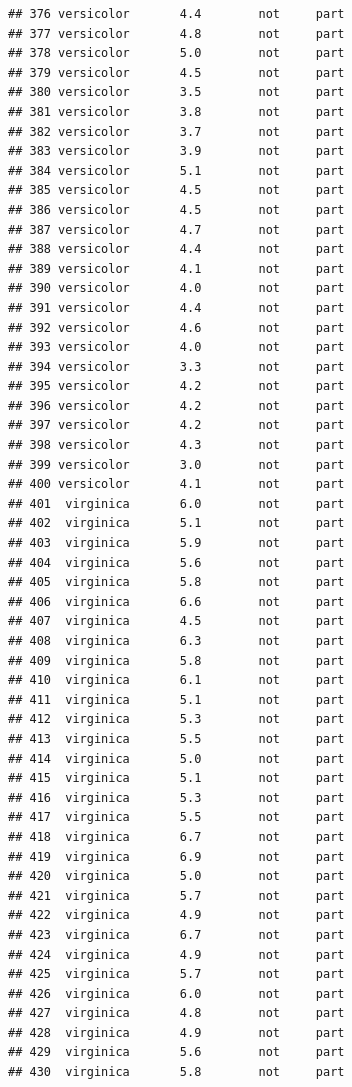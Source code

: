 \documentclass[krantz2]{krantz}\usepackage{knitr}%
\begin{document}
\begin{knitrout}
\begin{kframe}
\begin{verbatim}
## 376 versicolor       4.4        not     part
## 377 versicolor       4.8        not     part
## 378 versicolor       5.0        not     part
## 379 versicolor       4.5        not     part
## 380 versicolor       3.5        not     part
## 381 versicolor       3.8        not     part
## 382 versicolor       3.7        not     part
## 383 versicolor       3.9        not     part
## 384 versicolor       5.1        not     part
## 385 versicolor       4.5        not     part
## 386 versicolor       4.5        not     part
## 387 versicolor       4.7        not     part
## 388 versicolor       4.4        not     part
## 389 versicolor       4.1        not     part
## 390 versicolor       4.0        not     part
## 391 versicolor       4.4        not     part
## 392 versicolor       4.6        not     part
## 393 versicolor       4.0        not     part
## 394 versicolor       3.3        not     part
## 395 versicolor       4.2        not     part
## 396 versicolor       4.2        not     part
## 397 versicolor       4.2        not     part
## 398 versicolor       4.3        not     part
## 399 versicolor       3.0        not     part
## 400 versicolor       4.1        not     part
## 401  virginica       6.0        not     part
## 402  virginica       5.1        not     part
## 403  virginica       5.9        not     part
## 404  virginica       5.6        not     part
## 405  virginica       5.8        not     part
## 406  virginica       6.6        not     part
## 407  virginica       4.5        not     part
## 408  virginica       6.3        not     part
## 409  virginica       5.8        not     part
## 410  virginica       6.1        not     part
## 411  virginica       5.1        not     part
## 412  virginica       5.3        not     part
## 413  virginica       5.5        not     part
## 414  virginica       5.0        not     part
## 415  virginica       5.1        not     part
## 416  virginica       5.3        not     part
## 417  virginica       5.5        not     part
## 418  virginica       6.7        not     part
## 419  virginica       6.9        not     part
## 420  virginica       5.0        not     part
## 421  virginica       5.7        not     part
## 422  virginica       4.9        not     part
## 423  virginica       6.7        not     part
## 424  virginica       4.9        not     part
## 425  virginica       5.7        not     part
## 426  virginica       6.0        not     part
## 427  virginica       4.8        not     part
## 428  virginica       4.9        not     part
## 429  virginica       5.6        not     part
## 430  virginica       5.8        not     part

\end{verbatim}
\end{kframe}
\end{knitrout}
\end{document}
